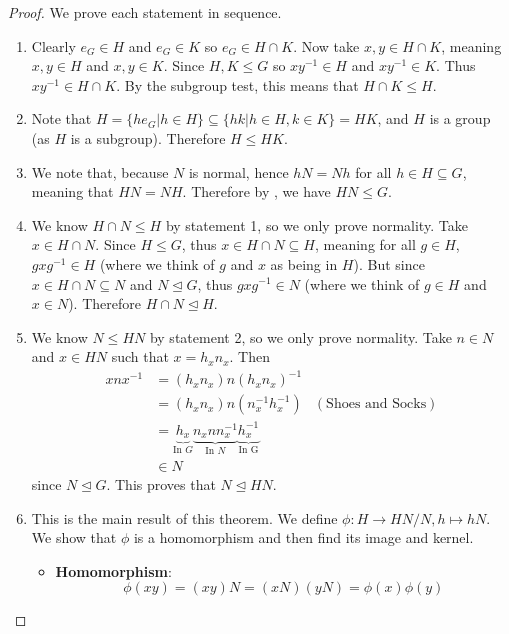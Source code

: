 \begin{proof}
    We prove each statement in sequence.

    \begin{enumerate}
        \item Clearly $e_G \in H$ and $e_G \in K$ so $e_G \in H \cap K$. Now take $x, y \in H \cap K$, meaning $x, y \in H$ and $x, y \in K$. Since $H, K \leq G$ so $xy^{-1} \in H$ and $xy^{-1} \in K$. Thus $xy^{-1} \in H \cap K$. By the subgroup test, this means that $H \cap K \leq H$.
        
        \item Note that $H = \{he_G \vert h \in H\} \subseteq \{hk \vert h \in H, k \in K\} = HK$, and $H$ is a group (as $H$ is a subgroup). Therefore $H \leq HK$.
        
        \item We note that, because $N$ is normal, hence $hN = Nh$ for all $h \in H \subseteq G$, meaning that $HN = NH$. Therefore by , we have $HN \leq G$.

        \item We know $H \cap N \leq H$ by statement 1, so we only prove normality. Take $x \in H \cap N$. Since $H \leq G$, thus $x \in H \cap N \subseteq H$, meaning for all $g \in H$, $gxg^{-1} \in H$ (where we think of $g$ and $x$ as being in $H$). But since $x \in H \cap N \subseteq N$ and $N \unlhd G$, thus $gxg^{-1} \in N$ (where we think of $g \in H$ and $x \in N$). Therefore $H \cap N \unlhd H$.

        \item We know $N \leq HN$ by statement 2, so we only prove normality. Take $n \in N$ and $x \in HN$ such that $x = h_xn_x$. Then
        \begin{align*}
            xnx^{-1} &= (h_xn_x)n(h_xn_x)^{-1}\\
            &= (h_xn_x)n(n_x^{-1}h_x^{-1}) & (\text{Shoes and Socks})\\
            &= \underbrace{h_x}_{\text{In }G}\underbrace{n_xnn_x^{-1}}_{\text{In }N}\underbrace{h_x^{-1}}_{\text{In G}}\\
            &\in N
        \end{align*}
        since $N \unlhd G$. This proves that $N \unlhd HN$.

        \item This is the main result of this theorem. We define $\phi: H \to HN/N, h \mapsto hN$. We show that $\phi$ is a homomorphism and then find its image and kernel.
        \begin{itemize}
            \item \textbf{Homomorphism}:
            \[
                \phi(xy) = (xy)N = (xN)(yN) = \phi(x)\phi(y)    
            \]


\end{itemize}
\end{enumerate}
\end{proof}

